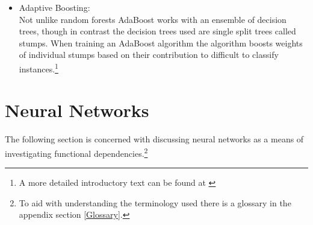 \begin{itemize}
		\item Adaptive Boosting:\\
			Not unlike random forests AdaBoost works with an ensemble of decision trees, though in contrast the decision trees used are single split trees called stumps. When training an AdaBoost algorithm the algorithm boosts weights of individual stumps based on their contribution to difficult to classify instances.\footnote{A more detailed introductory text can be found at \cite{AdaBoost}}
	\end{itemize}
	\section{Neural Networks}
		The following section is concerned with discussing neural networks as a means of investigating functional dependencies.\footnote{To aid with understanding the terminology used there is a glossary in the appendix section \ref{Glossary}.}\\		
